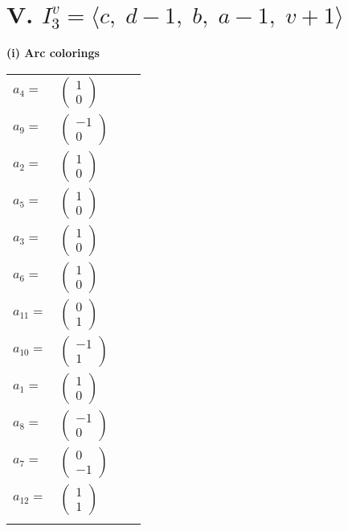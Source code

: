 \documentclass[1p]{elsarticle_modified}
\theoremstyle{definition}
\begin{document}
\centering \section*{V. $I^v_{3}= \langle c,\;d-1,\;b,\;a-1,\;v+1 \rangle$}
\flushleft \textbf{(i) Arc colorings}\\
\begin{tabular}{m{7pt} m{180pt} m{7pt} m{180pt} }
\flushright $a_{4}=$&$\begin{pmatrix}1\\0\end{pmatrix}$ \\
\flushright $a_{9}=$&$\begin{pmatrix}-1\\0\end{pmatrix}$ \\
\flushright $a_{2}=$&$\begin{pmatrix}1\\0\end{pmatrix}$ \\
\flushright $a_{5}=$&$\begin{pmatrix}1\\0\end{pmatrix}$ \\
\flushright $a_{3}=$&$\begin{pmatrix}1\\0\end{pmatrix}$ \\
\flushright $a_{6}=$&$\begin{pmatrix}1\\0\end{pmatrix}$ \\
\flushright $a_{11}=$&$\begin{pmatrix}0\\1\end{pmatrix}$ \\
\flushright $a_{10}=$&$\begin{pmatrix}-1\\1\end{pmatrix}$ \\
\flushright $a_{1}=$&$\begin{pmatrix}1\\0\end{pmatrix}$ \\
\flushright $a_{8}=$&$\begin{pmatrix}-1\\0\end{pmatrix}$ \\
\flushright $a_{7}=$&$\begin{pmatrix}0\\-1\end{pmatrix}$ \\
\flushright $a_{12}=$&$\begin{pmatrix}1\\1\end{pmatrix}$\\&\end{tabular}
\end{document}
